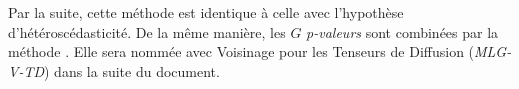 Par la suite, cette méthode est identique à celle avec l'hypothèse d'hétéroscédasticité. 
De la même manière, les $G$ \textit{p-valeurs} sont combinées par la méthode \cite{Whitlock2005}.
Elle sera nommée \mlg avec Voisinage pour les Tenseurs de Diffusion (\textit{MLG-V-TD}) dans la suite du document.

